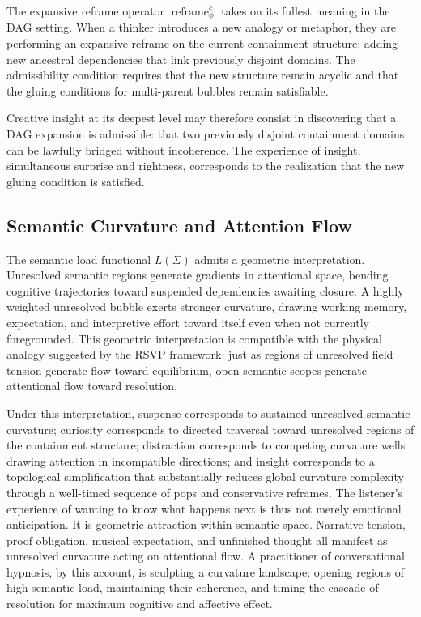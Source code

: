 \documentclass[12pt, a4paper]{article}
\theoremstyle{plain}
\theoremstyle{definition}
\theoremstyle{remark}
\DeclareMathOperator{\Reframe}{reframe}
\begin{document}
The expansive reframe operator $\Reframe^e_\phi$ takes on its fullest meaning
in the DAG setting. When a thinker introduces a new analogy or metaphor, they
are performing an expansive reframe on the current containment structure:
adding new ancestral dependencies that link previously disjoint domains. The
admissibility condition requires that the new structure remain acyclic and
that the gluing conditions for multi-parent bubbles remain satisfiable.

Creative insight at its deepest level may therefore consist in discovering
that a DAG expansion is admissible: that two previously disjoint containment
domains can be lawfully bridged without incoherence. The experience of
insight, simultaneous surprise and rightness, corresponds to the realization
that the new gluing condition is satisfied.


\subsection{Semantic Curvature and Attention Flow}

The semantic load functional $L(\Sigma)$ admits a geometric interpretation.
Unresolved semantic regions generate gradients in attentional space, bending
cognitive trajectories toward suspended dependencies awaiting closure. A highly
weighted unresolved bubble exerts stronger curvature, drawing working memory,
expectation, and interpretive effort toward itself even when not currently
foregrounded. This geometric interpretation is compatible with the physical
analogy suggested by the RSVP framework: just as regions of unresolved
field tension generate flow toward equilibrium, open semantic scopes generate
attentional flow toward resolution.

Under this interpretation, suspense corresponds to sustained unresolved
semantic curvature; curiosity corresponds to directed traversal toward
unresolved regions of the containment structure; distraction corresponds to
competing curvature wells drawing attention in incompatible directions; and
insight corresponds to a topological simplification that substantially reduces
global curvature complexity through a well-timed sequence of pops and
conservative reframes. The listener's experience of wanting to know what
happens next is thus not merely emotional anticipation. It is geometric
attraction within semantic space. Narrative tension, proof obligation, musical
expectation, and unfinished thought all manifest as unresolved curvature acting
on attentional flow. A practitioner of conversational hypnosis, by this
account, is sculpting a curvature landscape: opening regions of high semantic
load, maintaining their coherence, and timing the cascade of resolution for
maximum cognitive and affective effect.
\end{document}
